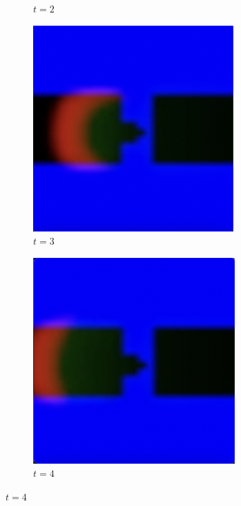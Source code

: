 \begin{figure}
\begin{subfigure}{0.24\textwidth}
		\caption*{$t = 2$}
	\end{subfigure}
    \begin{subfigure}{0.24\textwidth}
		\includegraphics[width=\linewidth]{diode/easy/Screenshot 2024-03-09 at 16.22.35.png}
		\caption*{$t = 3$}
	\end{subfigure}
    \begin{subfigure}{0.24\textwidth}
		\includegraphics[width=\linewidth]{diode/easy/Screenshot 2024-03-09 at 16.22.45.png}
		\caption*{$t = 4$}
	\end{subfigure}


\end{figure}
